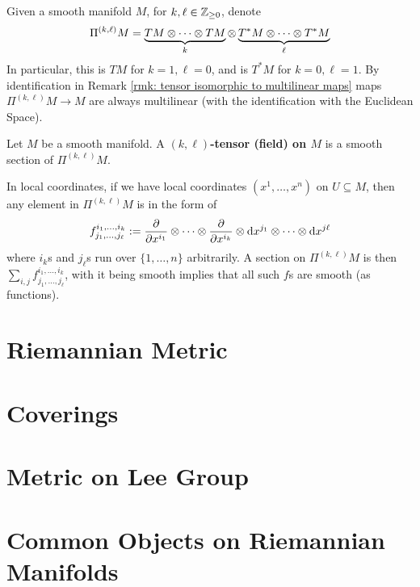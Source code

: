 \documentclass{article}
\begin{document}
\begin{notation}
    Given a smooth manifold $M$, for $k, \ell \in \mathbb{Z}_{\geq 0}$, denote
    \[
        \Pi^{(k, \ell)} M = \underbrace{TM \otimes \cdots \otimes TM}_{k} \otimes \underbrace{T^{\ast}M \otimes \cdots \otimes T^{\ast} M}_{\ell}
    \]
    In particular, this is $TM$ for $k = 1, \ell = 0$, and is $T^{\ast}M$ for $k = 0, \ell = 1$. By identification in Remark \ref{rmk: tensor isomorphic to multilinear maps} maps $\Pi^{(k, \ell)} M \to M$ are always multilinear (with the identification with the Euclidean Space). 
\end{notation}

\begin{definition}
    Let $M$ be a smooth manifold. A \textbf{$(k, \ell)$-tensor (field) on $M$} is a smooth section of $\Pi^{(k, \ell)} M$.
\end{definition}

\textstart
In local coordinates, if we have local coordinates $(x^1, \dots, x^n)$ on $U \subseteq M$, then any element in $\Pi^{(k, \ell)} M$ is in the form of 
\[
    f_{j_1, \dots, j_{\ell}}^{i_1, \dots, i_k} := \frac{\partial}{\partial x^{i_1}} \otimes \cdots \otimes \frac{\partial}{\partial x^{i_k}} \otimes \mathrm{d} x^{j_1} \otimes \cdots \otimes \mathrm{d} x^{j \ell}
\]
where $i_k$s and $j_{\ell}$s run over $\{ 1, \dots, n \}$ arbitrarily. A section on $\Pi^{(k, \ell)} M$ is then $\sum_{i, j} f_{j_1, \dots, j_{\ell}}^{i_1, \dots, i_k}$, with it being smooth implies that all such $f$s are smooth (as functions).

\section{Riemannian Metric}

\section{Coverings}

\section{Metric on Lee Group}

\section{Common Objects on Riemannian Manifolds}
\end{document}
